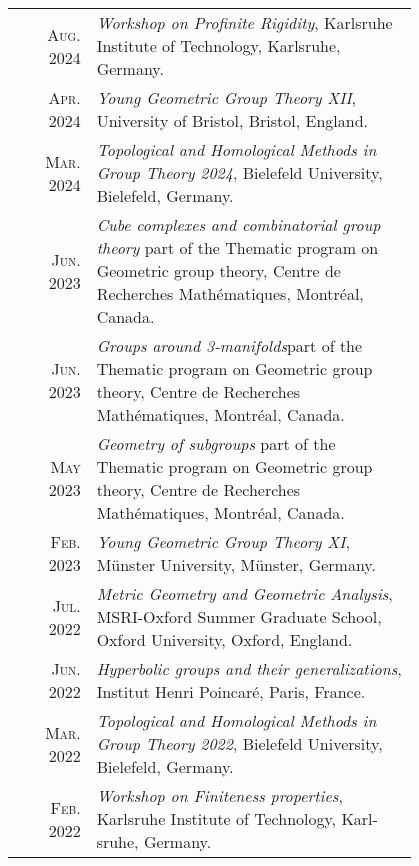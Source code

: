 \documentclass[a4paper,11pt]{article} %
\begin{document}
\begin{longtable}{rp{0.8\linewidth}}

    \textsc{Aug. 2024} & \emph{Workshop on Profinite Rigidity}, Karlsruhe Institute of Technology, Karlsruhe,
    Germany. \\

    \textsc{Apr. 2024} & \emph{Young Geometric Group Theory XII}, University of Bristol, Bristol, England.\\

    \textsc{Mar. 2024} & \emph{Topological and Homological Methods in Group Theory 2024}, Bielefeld
    University, Bielefeld, Germany.\\

    \textsc{Jun. 2023} & \emph{Cube complexes and combinatorial group theory} part of the Thematic program on Geometric group theory, Centre de Recherches Mathématiques, Montréal, Canada.\\

    \textsc{Jun. 2023} & \emph{Groups around 3-manifolds}part of the Thematic program on Geometric group theory,
    Centre de Recherches Mathématiques, Montréal, Canada.\\

    \textsc{May 2023} & \emph{Geometry of subgroups} part of the Thematic program on Geometric group theory, Centre
    de Recherches Mathématiques, Montréal, Canada.\\

    \textsc{Feb. 2023} & \emph{Young Geometric Group Theory XI}, Münster University, Münster, Germany.\\

    \textsc{Jul. 2022} & \emph{Metric Geometry and Geometric Analysis}, MSRI-Oxford Summer Graduate
    School, Oxford University, Oxford, England.\\

    \textsc{Jun. 2022} & \emph{Hyperbolic groups and their generalizations}, Institut Henri Poincaré, Paris,
    France.\\

    \textsc{Mar. 2022} & \emph{Topological and Homological Methods in Group Theory 2022}, Bielefeld University, Bielefeld, Germany.\\
    
    \textsc{Feb. 2022} & \emph{Workshop on Finiteness properties}, Karlsruhe Institute of Technology, Karl-
    sruhe, Germany.\\

\end{longtable}
\end{document}

